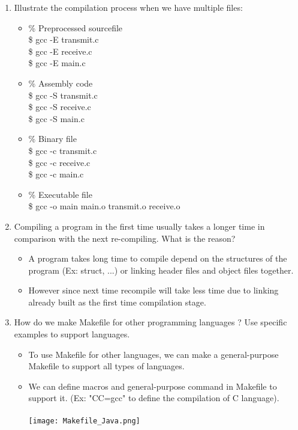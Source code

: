 \documentclass[a4paper]{article}
\begin{document}
\begin{enumerate}
    \item Illustrate the compilation process when we have multiple files:
    \begin{itemize}
        \item \% Preprocessed sourcefile \\
        \$ gcc -E transmit.c \\
        \$ gcc -E receive.c \\
        \$ gcc -E main.c      
        \item \% Assembly code \\
        \$ gcc -S transmit.c \\
        \$ gcc -S receive.c \\
        \$ gcc -S main.c
        \item \% Binary file \\
        \$ gcc -c transmit.c \\
        \$ gcc -c receive.c \\
        \$ gcc -c main.c
        \item \% Executable file \\
        \$ gcc -o main main.o transmit.o receive.o
    \end{itemize}
    
    \item Compiling a program in the first time usually takes a longer time in comparison with the next re-compiling. What is the reason?
    \begin{itemize}
        \item A program takes long time to compile depend on the structures of the program (Ex: struct, ...) or linking header files and object files together.
        \item However since next time recompile will take less time due to linking already built as the first time compilation stage.
    \end{itemize}

    \item How do we make Makefile for other programming languages ? Use specific examples to support languages.
    \begin{itemize}
        \item To use Makefile for other languages, we can make a general-purpose Makefile to support all types of languages. 
        \item We can define macros and general-purpose command in Makefile to support it. (Ex: "CC=gcc" to define the compilation of C language). \\
        \\
        \texttt{[image: Makefile\_Java.png]}
        \bigbreak
    \end{itemize}


\end{enumerate}
\end{document}

